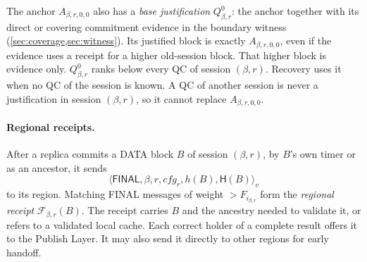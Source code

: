 \documentclass[11pt,a4paper]{article}
\newcommand{\FC}{\mathcal F}
\newcommand{\Hash}{\mathsf H}
\newcommand{\tagg}[1]{\ensuremath{\mathsf{#1}}}
\newcommand{\defterm}[1]{\textcolor{rrBlue}{\textit{#1}}}
\begin{document}
The anchor $A_{\beta,r,0,0}$ also has a \defterm{base justification} $Q_{\beta,r}^0$: the
anchor together with its direct or covering commitment evidence in the
boundary witness (\cref{sec:coverage,sec:witness}). Its justified block
is exactly $A_{\beta,r,0,0}$, even if the evidence uses a receipt for a higher
old-session block. That higher block is evidence only. $Q_{\beta,r}^0$ ranks
below every QC of session $(\beta,r)$.
Recovery uses it when no QC of the session is known. A QC of another
session is never a justification in session $(\beta,r)$, so it cannot replace
$A_{\beta,r,0,0}$.

\paragraph{Regional receipts.}
After a replica commits a DATA block $B$ of session $(\beta,r)$, by $B$'s own
timer or as an ancestor, it sends
\[
 \langle\tagg{FINAL},\beta,r,\mathit{cfg}_r,h(B),\Hash(B)\rangle_v
\]
to its region. Matching FINAL messages of weight
$>F_{i_{\beta,r}}$ form the \defterm{regional receipt} $\FC_{\beta,r}(B)$. The receipt carries $B$ and the ancestry needed to validate it, or
refers to a validated local cache. Each correct holder of a complete
result offers it to the Publish Layer. It may also send it directly to
other regions for early handoff.
\end{document}
